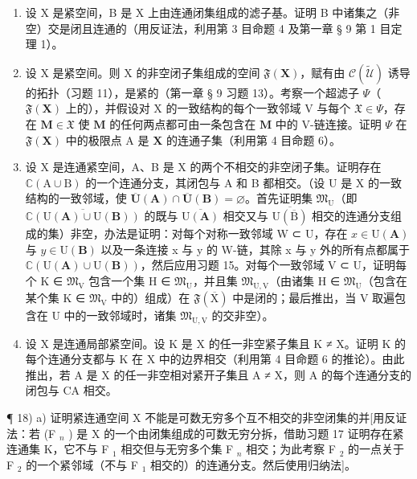 \begin{enumerate}
\def\labelenumi{\arabic{enumi})}
\setcounter{enumi}{13}
\item
  设 X 是紧空间，B 是 X 上由连通闭集组成的滤子基。证明 B 中诸集之（非空）交是闭且连通的（用反证法，利用第 3 目命题 4 及第一章 § 9 第 1 目定理 1）。
\item
  设 X 是紧空间。则 X 的非空闭子集组成的空间 \(\mathfrak{F}(\mathbf{X})\)，赋有由 \(\mathcal{C}(\tilde{\mathcal{U}})\) 诱导的拓扑（习题 11），是紧的（第一章 § 9 习题 13）。考察一个超滤子 \(\Psi\)（\(\mathfrak{F}(\mathbf{X})\) 上的），并假设对 X 的一致结构的每个一致邻域 V 与每个 \(\mathfrak{X} \in \Psi\)，存在 \(\mathbf{M} \in \mathfrak{X}\) 使 \(\mathbf{M}\) 的任何两点都可由一条包含在 \(\mathbf{M}\) 中的 V-链连接。证明 \(\Psi\) 在 \(\mathfrak{F}(\mathbf{X})\) 中的极限点 A 是 \(\mathbf{X}\) 的连通子集（利用第 4 目命题 6）。
\item
  设 X 是连通紧空间，A、B 是 X 的两个不相交的非空闭子集。证明存在 \(\mathbb{C}(\mathrm{A} \cup \mathrm{B})\) 的一个连通分支，其闭包与 A 和 B 都相交。（设 U 是 X 的一致结构的一致邻域，使 \(\overline{\mathbf{U}}(\mathbf{A}) \cap \overline{\mathbf{U}}(\mathbf{B}) = \varnothing\)。首先证明集 \(\mathfrak{M}_{\mathrm{U}}\)（即 \(\overline{\mathbb{C}(\mathrm{U}(\mathbf{A}) \cup \mathrm{U}(\mathbf{B}))}\) 的既与 \(\overline{\mathrm{U}(\mathbf{A})}\) 相交又与 \(\overline{\mathrm{U}(\overline{\mathrm{B}})}\) 相交的连通分支组成的集）非空，办法是证明：对每个对称一致邻域 W ⊂ U，存在 \(x \in \mathrm{U}(\mathbf{A})\) 与 \(y \in \mathrm{U}(\mathbf{B})\) 以及一条连接 x 与 y 的 W-链，其除 x 与 y 外的所有点都属于 \(\mathbb{C}(\mathrm{U}(\mathbf{A}) \cup \mathrm{U}(\mathbf{B}))\)，然后应用习题 15。对每个一致邻域 V ⊂ U，证明每个 K ∈ \(\mathfrak{M}_{\mathrm{V}}\) 包含一个集 H ∈ \(\mathfrak{M}_{\mathrm{U}}\)，并且集 \(\mathfrak{M}_{\mathrm{U},\mathrm{V}}\)（由诸集 H ∈ \(\mathfrak{M}_{\mathrm{U}}\)（包含在某个集 K ∈ \(\mathfrak{M}_{\mathrm{V}}\) 中的）组成）在 \(\mathfrak{F}(\overline{\mathrm{X}})\) 中是闭的；最后推出，当 V 取遍包含在 U 中的一致邻域时，诸集 \(\mathfrak{M}_{\mathrm{U},\mathrm{V}}\) 的交非空）。
\item
  设 X 是连通局部紧空间。设 K 是 X 的任一非空紧子集且 K ≠ X。证明 K 的每个连通分支都与 K 在 X 中的边界相交（利用第 4 目命题 6 的推论）。由此推出，若 A 是 X 的任一非空相对紧开子集且 A ≠ X，则 A 的每个连通分支的闭包与 CA 相交。
\end{enumerate}

¶ 18) a) 证明紧连通空间 X 不能是可数无穷多个互不相交的非空闭集的并{[}用反证法：若 (F \(_{n}\) ) 是 X 的一个由闭集组成的可数无穷分拆，借助习题 17 证明存在紧连通集 K，它不与 F \(_{1}\) 相交但与无穷多个集 F \(_{n}\) 相交；为此考察 F \(_{2}\) 的一点关于 F \(_{2}\) 的一个紧邻域（不与 F \(_{1}\) 相交的）的连通分支。然后使用归纳法{]}。

